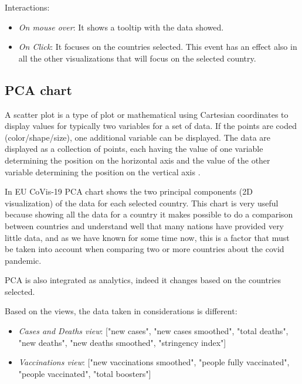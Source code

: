 \documentclass[10pt,conference]{IEEEtran}
\begin{document}
Interactions:
\begin{itemize}
 \item {\em On mouse over}: It shows a tooltip with the data showed.
 \item {\em On Click}: It focuses on the countries selected. This event has an effect also in all the other visualizations that will focus on the selected country.
\end{itemize}

\begin{figure}
\end{figure}

\subsection{PCA chart}
A scatter plot is a type of plot or mathematical
using Cartesian coordinates to display values for typically two variables for a set of data. If the points are coded (color/shape/size), 
one additional variable can be displayed. The data are displayed as a collection of points, each having the value of one variable 
determining the position on the horizontal axis and the value of the other variable determining the position on the vertical axis \cite{scatter}.

In EU CoVis-19 PCA chart shows the two principal components (2D visualization) of the data for each selected country. This chart is very useful because showing all the data for a country it makes possible to do a comparison between 
countries and understand well that many nations have provided very little data, and as we have known for some time now, this is a factor that must be taken into account when comparing two or more countries about the covid pandemic.

PCA is also integrated as analytics, indeed it changes based on the countries selected.

Based on the views, the data taken in considerations is different:
\begin{itemize}
 \item {\em Cases and Deaths view}: ["new cases", "new cases smoothed", "total deaths", "new deaths", "new deaths smoothed", "stringency index"]
 \item {\em Vaccinations view}: ["new vaccinations smoothed", "people fully vaccinated", "people vaccinated", "total boosters"]
\end{itemize}
\end{document}
